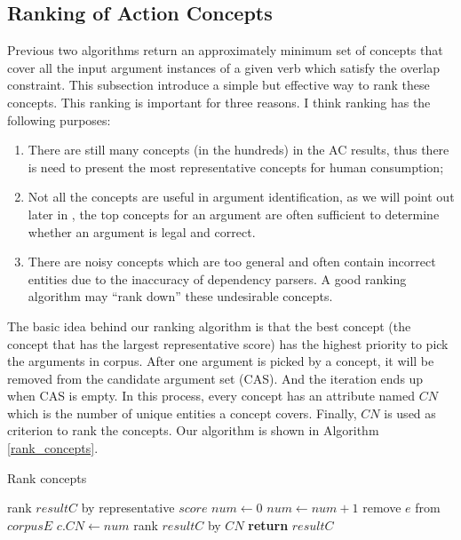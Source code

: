 \subsection{Ranking of Action Concepts}
\label{sec:rank}
Previous two algorithms return an approximately  minimum set of
concepts that cover all the input argument instances of a given verb
which satisfy the overlap constraint. This subsection introduce a
simple but effective way to rank these concepts. This ranking is
important for three reasons.
I think ranking has the following purposes:
\begin{enumerate}
\item There are still many concepts (in the hundreds) in the AC results,
thus there is need to present the most representative concepts for
human consumption;
\item Not all the concepts are useful in argument identification,
as we will point out later in , the top concepts for
an argument are often sufficient to determine whether an argument is
legal and correct.
\item There are noisy concepts which are too general and often contain
incorrect entities due to the inaccuracy of dependency parsers. A
good ranking algorithm may ``rank down'' these undesirable concepts.
\end{enumerate}

The basic idea behind our ranking algorithm is that the best concept
(the concept that has the largest representative score) has the highest
priority to pick the arguments in corpus. After one argument is
picked by a concept, it will be removed from the candidate argument set
(CAS). And the iteration ends up when CAS is empty.
In this process, every concept has an attribute named $CN$
which is the number of unique entities a concept covers.
Finally, $CN$ is used as criterion to rank the concepts.
Our algorithm is shown in Algorithm \ref{rank_concepts}.

\begin{algorithm}[th]
\caption{Rank concepts}
\label{rank_concepts}
\begin{algorithmic}[1]
\State rank $resultC$ by representative $score$
\State $num \leftarrow 0$
\State $num \leftarrow num+1$
\State remove $e$ from $corpusE$
\EndIf
\EndFor
\State $c.CN\leftarrow num$
\EndFor
\State rank $resultC$ by $CN$
\State \textbf{return} $resultC$
\EndFunction
\end{algorithmic}
\end{algorithm}

